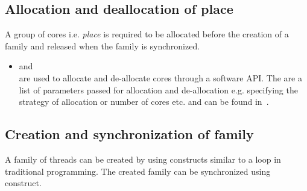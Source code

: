 \documentclass{article}
\begin{document}
\subsection*{Allocation and deallocation of place}

A group of cores i.e. \emph{place} is required to be allocated before the
creation of a family and released when the family is synchronized.

\begin{itemize}

\item  and  \\ are used to
    allocate and de-allocate cores through a software API. The 
    are a list of parameters passed for allocation and de-allocation e.g.
    specifying the strategy of allocation or number of cores etc. and can be
    found in~\cite{SEP}.

\end{itemize}

\subsection*{Creation and synchronization of family}
\label{sn:creation_synchronization}

A family of threads can be created by using  constructs similar to
a loop in traditional programming. The created family can be synchronized using
 construct. 
\end{document}
